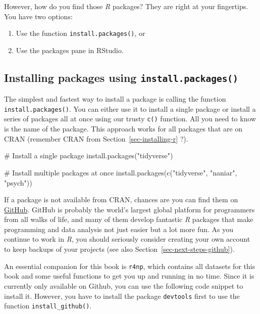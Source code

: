 \documentclass[
  letterpaper,
  DIV=11,
  numbers=noendperiod]{scrreprt}
\newenvironment{Shaded}{\begin{snugshade}}{\end{snugshade}}
\newcommand{\CommentTok}[1]{\textcolor[rgb]{0.37,0.37,0.37}{#1}}
\newcommand{\FunctionTok}[1]{\textcolor[rgb]{0.28,0.35,0.67}{#1}}
\newcommand{\NormalTok}[1]{\textcolor[rgb]{0.00,0.23,0.31}{#1}}
\newcommand{\StringTok}[1]{\textcolor[rgb]{0.13,0.47,0.30}{#1}}
\begin{document}
However, how do you find those \emph{R} packages? They are right at your
fingertips. You have two options:

\begin{enumerate}
\def\labelenumi{\arabic{enumi}.}
\item
  Use the function \texttt{install.packages()}, or
\item
  Use the packages pane in RStudio.
\end{enumerate}

\subsection{\texorpdfstring{Installing packages using
\texttt{install.packages()}}{Installing packages using install.packages()}}\label{sec-installing-packages-using-a-function}

The simplest and fastest way to install a package is calling the
function \texttt{install.packages()}. You can either use it to install a
single package or install a series of packages all at once using our
trusty \texttt{c()} function. All you need to know is the name of the
package. This approach works for all packages that are on CRAN (remember
CRAN from Section~\ref{sec-installing-r} ?).

\begin{Shaded}
\begin{Highlighting}[]
\CommentTok{\# Install a single package}
\FunctionTok{install.packages}\NormalTok{(}\StringTok{"tidyverse"}\NormalTok{)}

\CommentTok{\# Install multiple packages at once}
\FunctionTok{install.packages}\NormalTok{(}\FunctionTok{c}\NormalTok{(}\StringTok{"tidyverse"}\NormalTok{, }\StringTok{"naniar"}\NormalTok{, }\StringTok{"psych"}\NormalTok{))}
\end{Highlighting}
\end{Shaded}

If a package is not available from CRAN, chances are you can find them
on \href{https://github.com}{GitHub}. GitHub is probably the world's
largest global platform for programmers from all walks of life, and many
of them develop fantastic \emph{R} packages that make programming and
data analysis not just easier but a lot more fun. As you continue to
work in \emph{R}, you should seriously consider creating your own
account to keep backups of your projects (see also
Section~\ref{sec-next-steps-github}).

An essential companion for this book is \texttt{r4np}, which contains
all datasets for this book and some useful functions to get you up and
running in no time. Since it is currently only available on Github, you
can use the following code snippet to install it. However, you have to
install the package \texttt{devtools} first to use the function
\texttt{install\_github()}.
\end{document}
